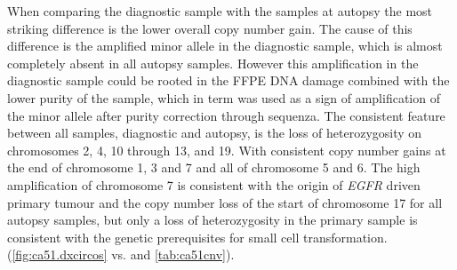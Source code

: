 When comparing the diagnostic sample with the samples at autopsy the most striking difference is the lower overall copy number gain. The cause of this difference is  the amplified minor allele in the diagnostic sample, which is almost completely absent in all autopsy samples. However this amplification in the diagnostic sample could be rooted in the FFPE DNA damage combined with the lower purity of the sample, which in term was used as a sign of amplification of the minor allele after purity correction through sequenza. 
The consistent feature between all samples, diagnostic and autopsy, is the loss of heterozygosity on chromosomes 2, 4, 10 through 13, and 19. With consistent copy number gains at the end of chromosome 1, 3 and 7 and all of chromosome 5 and 6.
The high amplification of chromosome 7 is consistent with the origin of \textit{EGFR} driven primary tumour and the copy number loss of the start of chromosome 17 for all autopsy samples, but only a loss of heterozygosity in the primary sample is consistent with the genetic prerequisites for small cell transformation. (\autoref{fig:ca51.dxcircos} vs.  and \autoref{tab:ca51cnv}).


